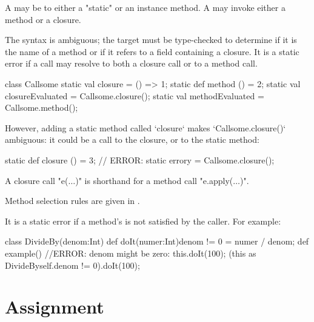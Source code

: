 A  may be to either a \xcd"static" or an 
instance method.  A  may invoke either a method
or a closure.  

The syntax is ambiguous; the target must be type-checked to determine if it is
the name of a method or if it refers to a field containing a closure. It is a
static error if a call may resolve to both a closure call or to a method call.
\begin{xten}
class Callsome {
  static val closure = () => 1;
  static def method () = 2;
  static val closureEvaluated = Callsome.closure();
  static val methodEvaluated = Callsome.method();
}
\end{xten}
%
However, adding a static method called \xcd`closure` makes \xcd`Callsome.closure()`
ambiguous: it could be a call to the closure, or to the static method: 

\begin{xten}
  static def closure () = 3;
  // ERROR: static errory = Callsome.closure();
\end{xten}

A closure call \xcdmath"e($\dots$)" is shorthand for a method call
\xcdmath"e.apply($\dots$)". 

Method selection rules are given in .

It is a static error if a method's  is not satisfied by the
caller.  For example: 
\begin{xten}
class DivideBy(denom:Int) {
  def doIt(numer:Int){denom != 0} = numer / denom;
  def example() {
     //ERROR: denom might be zero: this.doIt(100); 
     (this as DivideBy{self.denom != 0}).doIt(100);
  }
}
\end{xten}
%


\section{Assignment}\label{AssignmentStatement}

